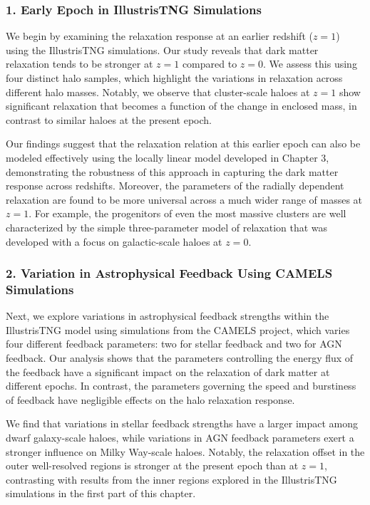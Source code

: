 \documentclass[a4paper, 12pt, oneside]{Thesis}  %
\begin{document}
\subsubsection*{1. Early Epoch in IllustrisTNG Simulations}
We begin by examining the relaxation response at an earlier redshift (\( z=1 \)) using the IllustrisTNG simulations. Our study reveals that dark matter relaxation tends to be stronger at \( z=1 \) compared to \( z=0 \). We assess this using four distinct halo samples, which highlight the variations in relaxation across different halo masses. Notably, we observe that cluster-scale haloes at \( z=1 \) show significant relaxation that becomes a function of the change in enclosed mass, in contrast to similar haloes at the present epoch.

Our findings suggest that the relaxation relation at this earlier epoch can also be modeled effectively using the locally linear model developed in Chapter 3, demonstrating the robustness of this approach in capturing the dark matter response across redshifts. Moreover, the parameters of the radially dependent relaxation are found to be more universal across a much wider range of masses at \( z=1 \). For example, the progenitors of even the most massive clusters are well characterized by the simple three-parameter model of relaxation that was developed with a focus on galactic-scale haloes at \( z=0 \).

\subsubsection*{2. Variation in Astrophysical Feedback Using CAMELS Simulations}
Next, we explore variations in astrophysical feedback strengths within the IllustrisTNG model using simulations from the CAMELS project, which varies four different feedback parameters: two for stellar feedback and two for AGN feedback. Our analysis shows that the parameters controlling the energy flux of the feedback have a significant impact on the relaxation of dark matter at different epochs. In contrast, the parameters governing the speed and burstiness of feedback have negligible effects on the halo relaxation response.

We find that variations in stellar feedback strengths have a larger impact among dwarf galaxy-scale haloes, while variations in AGN feedback parameters exert a stronger influence on Milky Way-scale haloes. Notably, the relaxation offset in the outer well-resolved regions is stronger at the present epoch than at \( z=1 \), contrasting with results from the inner regions explored in the IllustrisTNG simulations in the first part of this chapter.
\end{document}
